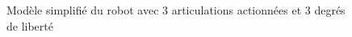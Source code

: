 \begin{figure}[!htb]
%				
%				
%				
%				
%				
%				
		
		\caption{Modèle simplifié du robot avec 3 articulations actionnées et 3 degrés de liberté}
		\label{fig_robot_simplified_model}
	\end{figure}